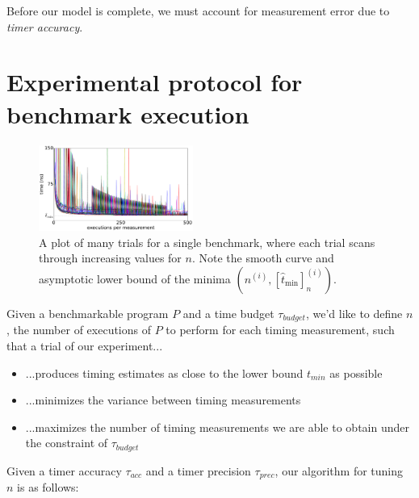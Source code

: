 \documentclass[conference]{IEEEtran}
\begin{document}
Before our model is complete, we must account for measurement error due to \textit{timer
accuracy}.

\label{sec:protocol}
\section{Experimental protocol for benchmark execution}

\begin{figure}
\centering
\includegraphics[width=0.45\textwidth]{figures/fig2/linear_scan_branchsum}
\caption{A plot of many trials for a single benchmark, where each trial scans through
increasing values for $n$. Note the smooth curve and asymptotic lower bound of the minima
$(n^{(i)}, [\hat{t}_{\textrm{min}}]^{(i)}_n)$.}
\label{fig:scaling}
\end{figure}

Given a benchmarkable program $P$ and a time budget $\tau_{budget}$, we'd like to define
$n$, the number of executions of $P$ to perform for each timing measurement, such that a
trial of our experiment...

\begin{itemize}
    \item ...produces timing estimates as close to the lower bound $t_{min}$ as possible
    \item ...minimizes the variance between timing measurements
    \item ...maximizes the number of timing measurements we are able to obtain under the
    constraint of $\tau_{budget}$
\end{itemize}

Given a timer accuracy $\tau_{acc}$ and a timer precision $\tau_{prec}$, our algorithm for
tuning $n$ is as follows:
\end{document}
